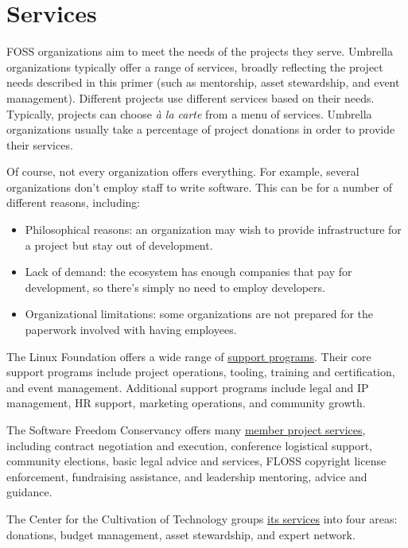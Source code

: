 


\chapter{Services}

FOSS organizations aim to meet the needs of the projects they serve.  Umbrella organizations typically offer a range of services, broadly reflecting the project needs described in this primer (such as mentorship, asset stewardship, and event management).  Different projects use different services based on their needs.  Typically, projects can choose \textit{à la carte} from a menu of services.  Umbrella organizations usually take a percentage of project donations in order to provide their services.

Of course, not every organization offers everything.  For example, several organizations don't employ staff to write software.  This can be for a number of different reasons, including:

\begin{itemize}

\item Philosophical reasons: an organization may wish to provide infrastructure for a project but stay out of development.
\item Lack of demand: the ecosystem has enough companies that pay for development, so there's simply no need to employ developers.
\item Organizational limitations: some organizations are not prepared for the paperwork involved with having employees.

\end{itemize}

\begin{kaobox}[frametitle=Example services and support programs]

The Linux Foundation offers a wide range of \href{https://www.linuxfoundation.org/en/projects/support-programs/}{support programs}.  Their core support programs include project operations, tooling, training and certification, and event management.  Additional support programs include legal and IP management, HR support, marketing operations, and community growth.

The Software Freedom Conservancy offers many \href{https://sfconservancy.org/projects/services/}{member project services}, including contract negotiation and execution, conference logistical support, community elections, basic legal advice and services, FLOSS copyright license enforcement, fundraising assistance, and leadership mentoring, advice and guidance.

The Center for the Cultivation of Technology groups \href{https://techcultivation.org/#overview}{its services} into four areas: donations, budget management, asset stewardship, and expert network.

\end{kaobox}

